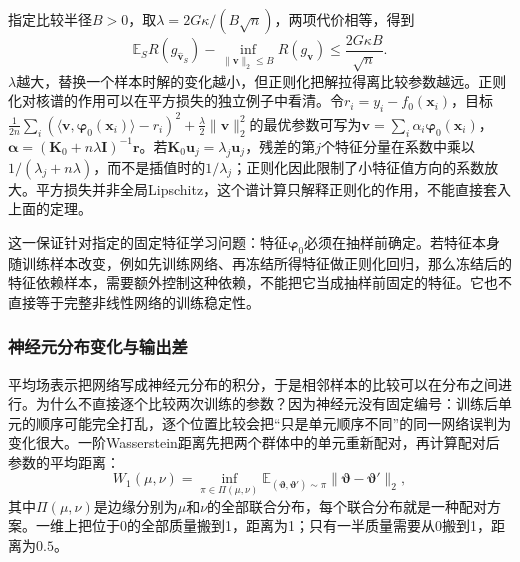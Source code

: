 指定比较半径$B>0$，取$\lambda=2G\kappa/(B\sqrt n)$，两项代价相等，得到
\begin{equation}
 \mathbb E_S R(g_{\widehat{\bm v}_S})
 -\inf_{\|\bm v\|_2\leq B}R(g_{\bm v})
 \leq\frac{2G\kappa B}{\sqrt n}.
 \label{eq:ntk-sample-risk}
\end{equation}
$\lambda$越大，替换一个样本时解的变化越小，但正则化把解拉得离比较参数越远。正则化对核谱的作用可以在平方损失的独立例子中看清。令$r_i=y_i-f_0(\bm x_i)$，目标$\frac1{2n}\sum_i(\langle\bm v,\bm\varphi_0(\bm x_i)\rangle-r_i)^2+\frac\lambda2\|\bm v\|_2^2$的最优参数可写为$\bm v=\sum_i\alpha_i\bm\varphi_0(\bm x_i)$，$\bm\alpha=(\bm K_0+n\lambda\bm I)^{-1}\bm r$。若$\bm K_0\bm u_j=\lambda_j\bm u_j$，残差的第$j$个特征分量在系数中乘以$1/(\lambda_j+n\lambda)$，而不是插值时的$1/\lambda_j$；正则化因此限制了小特征值方向的系数放大。平方损失并非全局Lipschitz，这个谱计算只解释正则化的作用，不能直接套入上面的定理。

这一保证针对指定的固定特征学习问题：特征$\bm\varphi_0$必须在抽样前确定。若特征本身随训练样本改变，例如先训练网络、再冻结所得特征做正则化回归，那么冻结后的特征依赖样本，需要额外控制这种依赖，不能把它当成抽样前固定的特征。它也不直接等于完整非线性网络的训练稳定性。

\subsubsection{神经元分布变化与输出差}

平均场表示把网络写成神经元分布的积分，于是相邻样本的比较可以在分布之间进行。为什么不直接逐个比较两次训练的参数？因为神经元没有固定编号：训练后单元的顺序可能完全打乱，逐个位置比较会把“只是单元顺序不同”的同一网络误判为变化很大。一阶Wasserstein距离先把两个群体中的单元重新配对，再计算配对后参数的平均距离：
\[
 W_1(\mu,\nu)=\inf_{\pi\in\Pi(\mu,\nu)}\mathbb E_{(\bm\vartheta,\bm\vartheta')\sim\pi}\|\bm\vartheta-\bm\vartheta'\|_2,
\]
其中$\Pi(\mu,\nu)$是边缘分别为$\mu$和$\nu$的全部联合分布，每个联合分布就是一种配对方案。一维上把位于0的全部质量搬到1，距离为1；只有一半质量需要从0搬到1，距离为$0.5$。

